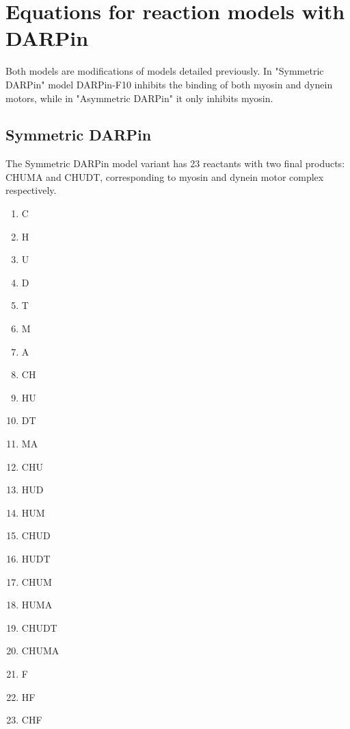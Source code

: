 \section{Equations for reaction models with DARPin}
\label{appendix:DARPinModelsEquations}

Both models are modifications of models detailed previously. In "Symmetric DARPin" model DARPin-F10 inhibits the binding of both myosin and dynein motors, while in "Asymmetric DARPin" it only inhibits myosin.

\subsection{Symmetric DARPin}

The Symmetric DARPin model variant has 23 reactants with two final products: CHUMA and CHUDT, corresponding to myosin and dynein motor complex respectively.

\begin{multicols}{4}
\begin{enumerate}

\item C%
\item H%
\item U%
\item D%
\item T%
\item M%
\item A%

\item CH%
\item HU%
\item DT%
\item MA%

\item CHU%
\item HUD        %
\item HUM                       %

\item CHUD             %
\item HUDT                %
\item CHUM                 %
\item HUMA              %

\item CHUDT          %
\item CHUMA         %

\item F           %
\item HF       %
\item CHF  %

\end{enumerate}
\end{multicols}

